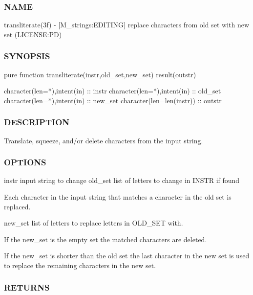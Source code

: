 \subsubsection*{N\+A\+ME}

transliterate(3f) -\/ \mbox{[}M\+\_\+strings\+:E\+D\+I\+T\+I\+NG\mbox{]} replace characters from old set with new set (L\+I\+C\+E\+N\+SE\+:PD) 

\subsubsection*{S\+Y\+N\+O\+P\+S\+IS}

\begin{DoxyVerb}pure function transliterate(instr,old_set,new_set) result(outstr)

 character(len=*),intent(in)  :: instr
 character(len=*),intent(in)  :: old_set
 character(len=*),intent(in)  :: new_set
 character(len=len(instr))    :: outstr
\end{DoxyVerb}
 \subsubsection*{D\+E\+S\+C\+R\+I\+P\+T\+I\+ON}

Translate, squeeze, and/or delete characters from the input string.

\subsubsection*{O\+P\+T\+I\+O\+NS}

instr input string to change old\+\_\+set list of letters to change in I\+N\+S\+TR if found \begin{DoxyVerb}     Each character in the input string that matches a character in
     the old set is replaced.
\end{DoxyVerb}
 new\+\_\+set list of letters to replace letters in O\+L\+D\+\_\+\+S\+ET with. \begin{DoxyVerb}     If the new_set is the empty set the matched characters are deleted.

     If the new_set is shorter than the old set the last character in the
     new set is used to replace the remaining characters in the new set.
\end{DoxyVerb}
 \subsubsection*{R\+E\+T\+U\+R\+NS}


